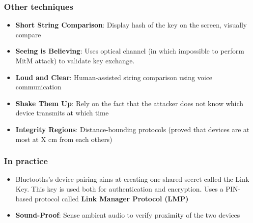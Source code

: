 \subsubsection{Other techniques}
\begin{itemize}
	\item \textbf{Short String Comparison}: Display hash of the key on the screen, visually compare 
	\item \textbf{Seeing is Believing}: Uses optical channel (in which impossible to perform MitM attack) to validate key exchange.
	\item \textbf{Loud and Clear}: Human-assisted string comparison using voice communication
	\item \textbf{Shake Them Up}: Rely on the fact that the attacker does not know which device transmits at which time
	\item \textbf{Integrity Regions}: Distance-bounding protocols (proved that devices are at most at X cm from each others)
\end{itemize}
\subsubsection{In practice}
\begin{itemize}
	\item Bluetooths's device pairing aims at creating one shared secret called the Link Key. This key is used both for authentication and encryption. Uses a PIN-based protocol called \textbf{Link Manager Protocol (LMP)}
	\item \textbf{Sound-Proof}: Sense ambient audio to verify proximity of the two devices
\end{itemize}


